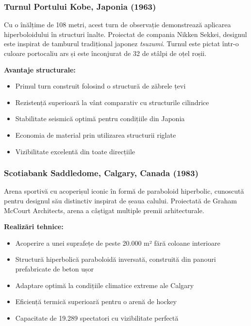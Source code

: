\documentclass[12pt,a4paper]{article}
\begin{document}
\subsubsection{Turnul Portului Kobe, Japonia (1963)}

Cu o înălțime de 108 metri, acest turn de observație demonstrează aplicarea hiperboloidului în structuri înalte. Proiectat de compania Nikken Sekkei, designul este inspirat de tamburul tradițional japonez \textit{tsuzumi}. Turnul este pictat într-o culoare portocaliu ars și este înconjurat de 32 de stâlpi de oțel roșii.

\textbf{Avantaje structurale:}
\begin{itemize}
    \item Primul turn construit folosind o structură de zăbrele țevi
    \item Rezistență superioară la vânt comparativ cu structurile cilindrice
    \item Stabilitate seismică optimă pentru condițiile din Japonia
    \item Economia de material prin utilizarea structurii riglate
    \item Vizibilitate excelentă din toate direcțiile
\end{itemize}

\subsubsection{Scotiabank Saddledome, Calgary, Canada (1983)}

Arena sportivă cu acoperișul iconic în formă de paraboloid hiperbolic, cunoscută pentru designul său distinctiv inspirat de șeaua calului. Proiectată de Graham McCourt Architects, arena a câștigat multiple premii arhitecturale.

\textbf{Realizări tehnice:}
\begin{itemize}
    \item Acoperire a unei suprafețe de peste 20.000 m² fără coloane interioare
    \item Structură hiperbolică paraboloidă inversată, construită din panouri prefabricate de beton ușor
    \item Adaptare optimă la condițiile climatice extreme ale Calgary
    \item Eficiență termică superioară pentru o arenă de hockey
    \item Capacitate de 19.289 spectatori cu vizibilitate perfectă
\end{itemize}
\end{document}
